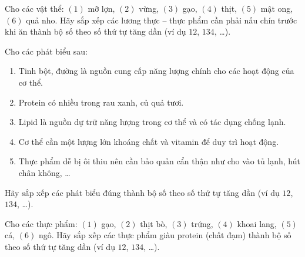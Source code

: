 \documentclass[Main.tex]{subfiles}
\begin{document}
\begin{ex}%
	Cho các vật thể: $(1)$ mỡ lợn, $(2)$ vừng, $(3)$ gạo, $(4)$ thịt, $(5)$ mật ong, $(6)$ quả nho. Hãy sắp xếp các lương thực -- thực phẩm cần phải nấu chín trước khi ăn thành bộ số theo số thứ tự tăng dần (ví dụ $12$, $134$, …).
\end{ex}

\begin{ex}%
	Cho các phát biểu sau:
	\begin{enumerate}[(1)]
		\item Tinh bột, đường là nguồn cung cấp năng lượng chính cho các hoạt động của cơ thể.
		\item Protein có nhiều trong rau xanh, củ quả tươi.
		\item Lipid là nguồn dự trữ năng lượng trong cơ thể và có tác dụng chống lạnh.
		\item Cơ thể cần một lượng lớn khoáng chất và vitamin để duy trì hoạt động.
		\item Thực phẩm dễ bị ôi thiu nên cần bảo quản cẩn thận như cho vào tủ lạnh, hút chân không, …
	\end{enumerate}
	Hãy sắp xếp các phát biểu đúng thành bộ số theo số thứ tự tăng dần (ví dụ $12$, $134$, …).
\end{ex}

\begin{ex}%
	Cho các thực phẩm: $(1)$ gạo, $(2)$ thịt bò, $(3)$ trứng, $(4)$ khoai lang, $(5)$ cá, $(6)$ ngô. Hãy sắp xếp các thực phẩm giàu protein (chất đạm) thành bộ số theo số thứ tự tăng dần (ví dụ $12$, $134$, …).
\end{ex}
\end{document}
